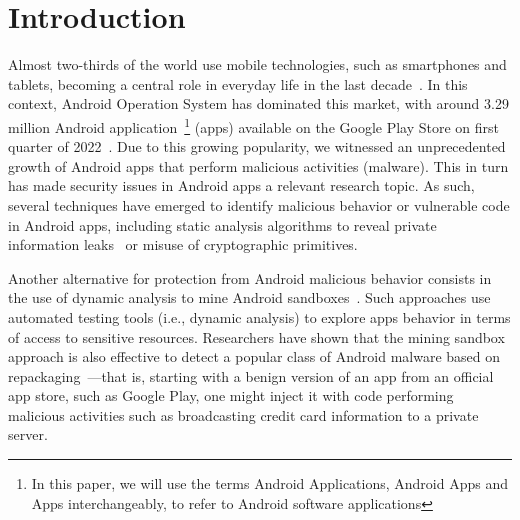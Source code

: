 \section{Introduction}\label{sec:introduction}

Almost two-thirds of the world use mobile technologies, such as smartphones and tablets, becoming a central role in everyday life in the last decade~\cite{Comscore,DBLP:journals/tse/MartinSJZH17}. In this context, Android Operation System has dominated this market, with around 3.29 million Android application~\footnote{In this paper, we will use the terms Android Applications, Android Apps and Apps interchangeably, to refer to Android software applications} (apps) available on the Google Play Store on first quarter of 2022~\cite{Statista}. Due to this growing popularity, we witnessed an unprecedented growth of  Android apps that perform malicious activities (malware).  This in turn has made security issues in Android apps a relevant research topic. As such, several techniques have emerged to identify malicious behavior or vulnerable code in Android apps, including static analysis algorithms to reveal private information leaks~\cite{DBLP:conf/pldi/ArztRFBBKTOM14} or misuse of 
cryptographic primitives.~\cite{DBLP:journals/tse/KrugerSABM21}

Another alternative for protection from Android malicious behavior consists in the use of dynamic analysis to mine Android sandboxes~\cite{DBLP:conf/icse/JamrozikSZ16}. Such approaches use automated testing tools (i.e., dynamic analysis) to explore apps behavior in terms of access to sensitive resources. Researchers have shown that the mining sandbox approach is also effective to detect a popular class of Android malware based on repackaging~\cite{DBLP:conf/wcre/BaoLL18,le2018towards}---that is, starting with a benign version of an app from an official app store, such as Google Play, one might inject it with code performing malicious activities such as broadcasting credit card information to a private server.~\cite{DBLP:journals/tse/LiBK21} %


